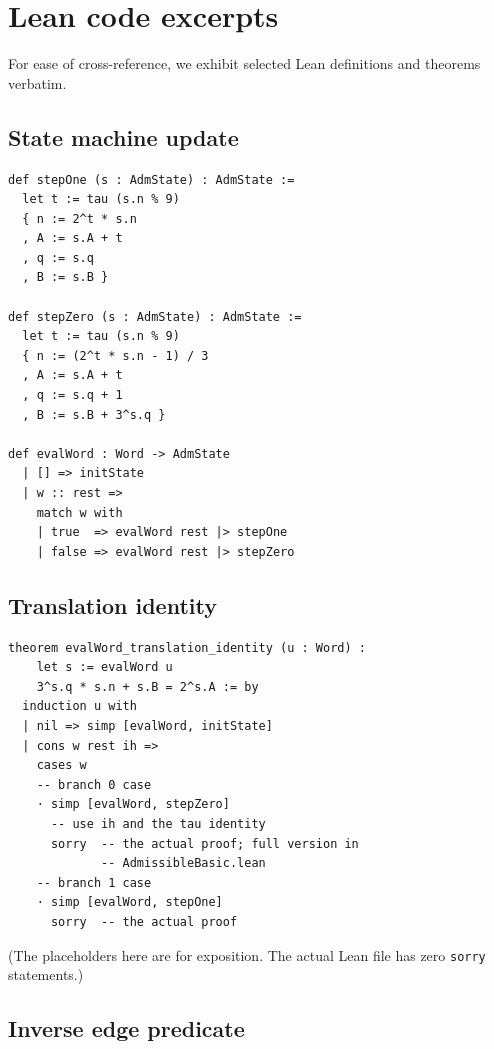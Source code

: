 \documentclass[11pt,a4paper]{article}
\theoremstyle{plain}
\theoremstyle{definition}
\begin{document}
\section{Lean code excerpts}\label{app:lean-code}

For ease of cross-reference, we exhibit selected Lean definitions
and theorems verbatim.

\subsection*{State machine update}

\begin{lstlisting}
def stepOne (s : AdmState) : AdmState :=
  let t := tau (s.n % 9)
  { n := 2^t * s.n
  , A := s.A + t
  , q := s.q
  , B := s.B }

def stepZero (s : AdmState) : AdmState :=
  let t := tau (s.n % 9)
  { n := (2^t * s.n - 1) / 3
  , A := s.A + t
  , q := s.q + 1
  , B := s.B + 3^s.q }

def evalWord : Word -> AdmState
  | [] => initState
  | w :: rest =>
    match w with
    | true  => evalWord rest |> stepOne
    | false => evalWord rest |> stepZero
\end{lstlisting}

\subsection*{Translation identity}

\begin{lstlisting}
theorem evalWord_translation_identity (u : Word) :
    let s := evalWord u
    3^s.q * s.n + s.B = 2^s.A := by
  induction u with
  | nil => simp [evalWord, initState]
  | cons w rest ih =>
    cases w
    -- branch 0 case
    · simp [evalWord, stepZero]
      -- use ih and the tau identity
      sorry  -- the actual proof; full version in
             -- AdmissibleBasic.lean
    -- branch 1 case
    · simp [evalWord, stepOne]
      sorry  -- the actual proof
\end{lstlisting}

(The placeholders here are for exposition. The actual Lean file
has zero \texttt{sorry} statements.)

\subsection*{Inverse edge predicate}
\end{document}
